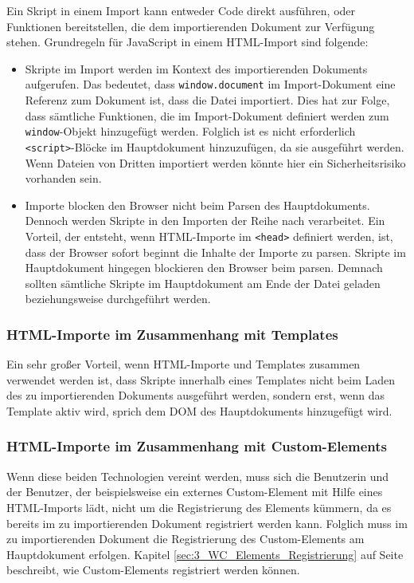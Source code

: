 Ein Skript in einem Import kann entweder Code direkt ausführen, oder Funktionen bereitstellen, die dem importierenden Dokument zur Verfügung stehen. Grundregeln für JavaScript in einem HTML-Import sind folgende:
\begin{itemize}
\item Skripte im Import werden im Kontext des importierenden Dokuments aufgerufen. Das bedeutet, dass \lstinline|window.document| im Import-Dokument eine Referenz zum Dokument ist, dass die Datei importiert. Dies hat zur Folge, dass sämtliche Funktionen, die im Import-Dokument definiert werden zum \lstinline|window|-Objekt hinzugefügt werden. Folglich ist es nicht erforderlich \lstinline|<script>|-Blöcke im Hauptdokument hinzuzufügen, da sie ausgeführt werden. Wenn Dateien von Dritten importiert werden könnte hier ein Sicherheitsrisiko vorhanden sein.
\item Importe blocken den Browser nicht beim Parsen des Hauptdokuments. Dennoch werden Skripte in den Importen der Reihe nach verarbeitet. Ein Vorteil, der entsteht, wenn HTML-Importe im \lstinline|<head>| definiert werden, ist, dass der Browser sofort beginnt die Inhalte der Importe zu parsen. Skripte im Hauptdokument hingegen blockieren den Browser beim parsen. Demnach sollten sämtliche Skripte im Hauptdokument am Ende der Datei geladen beziehungsweise durchgeführt werden.
\end{itemize}

\subsubsection{HTML-Importe im Zusammenhang mit Templates}

Ein sehr großer Vorteil, wenn HTML-Importe und Templates zusammen verwendet werden ist, dass Skripte innerhalb eines Templates nicht beim Laden des zu importierenden Dokuments ausgeführt werden, sondern erst, wenn das Template aktiv wird, sprich dem DOM des Hauptdokuments hinzugefügt wird.

\subsubsection{HTML-Importe im Zusammenhang mit Custom-Elements}

Wenn diese beiden Technologien vereint werden, muss sich die Benutzerin und der Benutzer, der beispielsweise ein externes Custom-Element mit Hilfe eines HTML-Imports lädt, nicht um die Registrierung des Elements kümmern, da es bereits im zu importierenden Dokument registriert werden kann. Folglich muss im zu importierenden Dokument die Registrierung des Custom-Elements am Hauptdokument erfolgen. Kapitel \ref{sec:3_WC_Elements_Registrierung} auf Seite \pageref{sec:3_WC_Elements_Registrierung} beschreibt, wie Custom-Elements registriert werden können.

